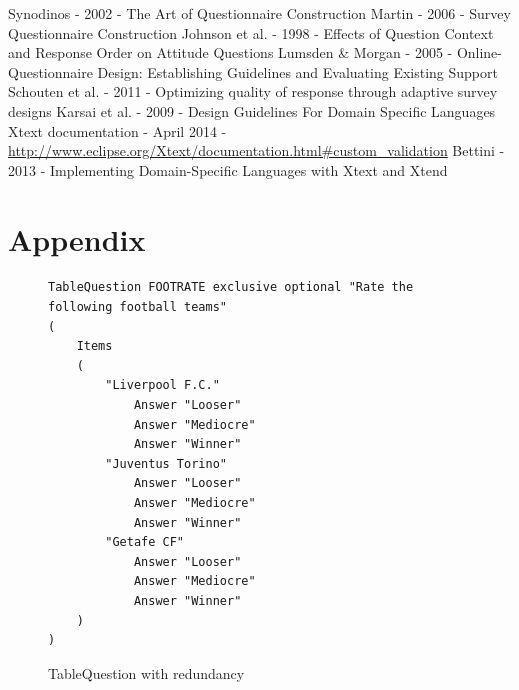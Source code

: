 \documentclass[runningheads,a4paper]{llncs}
\begin{document}
\begin{thebibliography}{4}

 Synodinos - 2002 - The Art of Questionnaire Construction
 Martin - 2006 - Survey Questionnaire Construction
 Johnson et al. - 1998 - Effects of Question Context and Response Order on Attitude Questions
 Lumsden \& Morgan - 2005 - Online-Questionnaire Design: Establishing Guidelines and Evaluating Existing Support
 Schouten et al. - 2011 - Optimizing quality of response through adaptive survey designs
 Karsai et al. - 2009 - Design Guidelines For Domain Specific Languages
 Xtext documentation - April 2014 - \url{http://www.eclipse.org/Xtext/documentation.html#custom_validation}
 Bettini - 2013 - Implementing Domain-Specific Languages with Xtext and Xtend

\end{thebibliography}
\newpage
{}
{}
\section*{Appendix}
\label{appendix}
\begin{figure}[htb]
\begin{lstlisting}[language=survey]
TableQuestion FOOTRATE exclusive optional "Rate the following football teams"
(
	Items 
	( 
		"Liverpool F.C."
			Answer "Looser"
			Answer "Mediocre"
			Answer "Winner"
		"Juventus Torino"
			Answer "Looser"
			Answer "Mediocre"
			Answer "Winner"
		"Getafe CF"
			Answer "Looser"
			Answer "Mediocre"
			Answer "Winner"
	)
)
\end{lstlisting}
\caption{TableQuestion with redundancy}
\label{fig:tablequestion_redundancy}
\end{figure}
\end{document}
